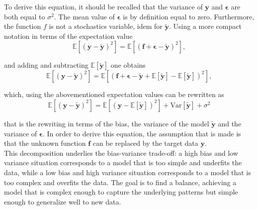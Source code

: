 \documentclass[
 reprint,            %
 amsmath,amssymb,
 aps,
]{revtex4-2}
\begin{document}
To derive this equation, it should be recalled that the variance of $\boldsymbol{y}$ and $\boldsymbol{\epsilon}$ are both equal to $\sigma^2$. The mean value of $\boldsymbol{\epsilon}$ is by definition equal to zero. Furthermore, the function $f$ is not a stochastics variable, idem for $\boldsymbol{\tilde{y}}$.
Using a more compact notation in terms of the expectation value
$$
\mathbb{E}\left[(\boldsymbol{y}-\boldsymbol{\tilde{y}})^2\right]=\mathbb{E}\left[(\boldsymbol{f}+\boldsymbol{\epsilon}-\boldsymbol{\tilde{y}})^2\right],
$$

and adding and subtracting $\mathbb{E}\left[\boldsymbol{\tilde{y}}\right]$ one obtains 
$$
\mathbb{E}\left[(\boldsymbol{y}-\boldsymbol{\tilde{y}})^2\right]=\mathbb{E}\left[(\boldsymbol{f}+\boldsymbol{\epsilon}-\boldsymbol{\tilde{y}}+\mathbb{E}\left[\boldsymbol{\tilde{y}}\right]-\mathbb{E}\left[\boldsymbol{\tilde{y}}\right])^2\right],
$$

which, using the abovementioned expectation values can be rewritten as
\begin{equation}
    \label{eq: bias-var-...}
\mathbb{E}\left[(\boldsymbol{y}-\boldsymbol{\tilde{y}})^2\right]=\mathbb{E}\left[(\boldsymbol{y}-\mathbb{E}\left[\boldsymbol{\tilde{y}}\right])^2\right]+\mathrm{Var}\left[\boldsymbol{\tilde{y}}\right]+\sigma^2
\end{equation}


that is the rewriting in terms of the bias, the variance of the model $\boldsymbol{\tilde{y}}$ and the variance of $\boldsymbol{\epsilon}$. \cite{misc} 
In order to derive this equation, the assumption that is made is that the unknown function $\boldsymbol{f}$ can be replaced by the target data $\boldsymbol{y}$.\\
This decomposition underlies the bias-variance trade-off: a high bias and low variance situation corresponds to a model that is too simple and underfits the data, while a low bias and high variance situation corresponds to a model that is too complex and overfits the data.
The goal is to find a balance, achieving a model that is complex enough to capture the underlying patterns but simple enough to generalize well to new data.\\\\
\end{document}

